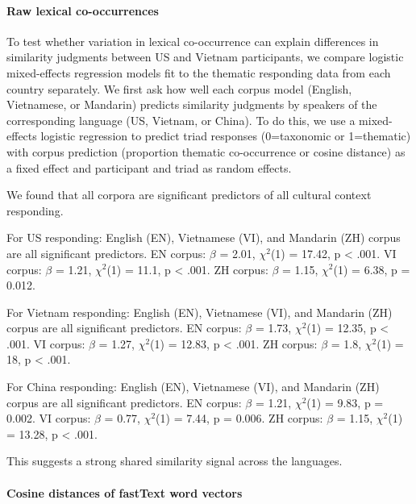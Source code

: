 \documentclass[10pt, letterpaper]{article}
\begin{document}
\hypertarget{raw-lexical-co-occurrences-1}{%
\paragraph{Raw lexical
co-occurrences}\label{raw-lexical-co-occurrences-1}}

To test whether variation in lexical co-occurrence can explain
differences in similarity judgments between US and Vietnam participants,
we compare logistic mixed-effects regression models fit to the thematic
responding data from each country separately. We first ask how well each
corpus model (English, Vietnamese, or Mandarin) predicts similarity
judgments by speakers of the corresponding language (US, Vietnam, or
China). To do this, we use a mixed-effects logistic regression to
predict triad responses (0=taxonomic or 1=thematic) with corpus
prediction (proportion thematic co-occurrence or cosine distance) as a
fixed effect and participant and triad as random effects.

We found that all corpora are significant predictors of all cultural
context responding.

For US responding: English (EN), Vietnamese (VI), and Mandarin (ZH)
corpus are all significant predictors. EN corpus: \(\beta\) = 2.01,
\(\chi^2\)(1) = 17.42, p \textless{} .001. VI corpus: \(\beta\) = 1.21,
\(\chi^2\)(1) = 11.1, p \textless{} .001. ZH corpus: \(\beta\) = 1.15,
\(\chi^2\)(1) = 6.38, p = 0.012.

For Vietnam responding: English (EN), Vietnamese (VI), and Mandarin (ZH)
corpus are all significant predictors. EN corpus: \(\beta\) = 1.73,
\(\chi^2\)(1) = 12.35, p \textless{} .001. VI corpus: \(\beta\) = 1.27,
\(\chi^2\)(1) = 12.83, p \textless{} .001. ZH corpus: \(\beta\) = 1.8,
\(\chi^2\)(1) = 18, p \textless{} .001.

For China responding: English (EN), Vietnamese (VI), and Mandarin (ZH)
corpus are all significant predictors. EN corpus: \(\beta\) = 1.21,
\(\chi^2\)(1) = 9.83, p = 0.002. VI corpus: \(\beta\) = 0.77,
\(\chi^2\)(1) = 7.44, p = 0.006. ZH corpus: \(\beta\) = 1.15,
\(\chi^2\)(1) = 13.28, p \textless{} .001.

This suggests a strong shared similarity signal across the languages.

\hypertarget{cosine-distances-of-fasttext-word-vectors}{%
\paragraph{Cosine distances of fastText word
vectors}\label{cosine-distances-of-fasttext-word-vectors}}
\end{document}
